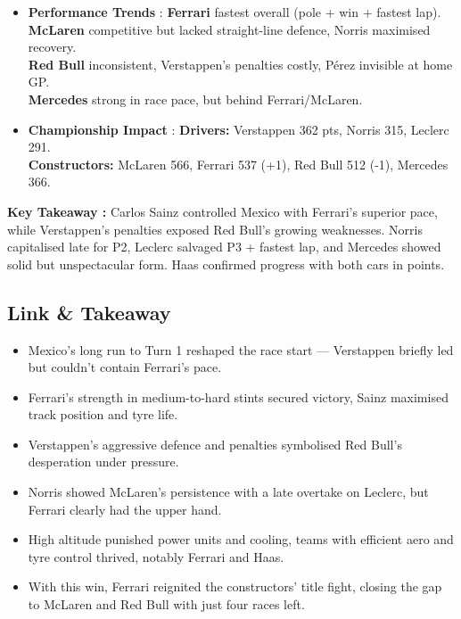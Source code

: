 \begin{itemize}
    \item \textbf{Performance Trends} : \textbf{Ferrari} fastest overall (pole + win + fastest lap). \\
    \textbf{McLaren} competitive but lacked straight-line defence, Norris maximised recovery. \\
    \textbf{Red Bull} inconsistent, Verstappen’s penalties costly, Pérez invisible at home GP. \\
    \textbf{Mercedes} strong in race pace, but behind Ferrari/McLaren.
    
    \item \textbf{Championship Impact} : \textbf{Drivers:} Verstappen 362 pts, Norris 315, Leclerc 291. \\
    \textbf{Constructors:} McLaren 566, Ferrari 537 (+1), Red Bull 512 (-1), Mercedes 366.
\end{itemize}

\textbf{Key Takeaway :} Carlos Sainz controlled Mexico with Ferrari’s superior pace, while Verstappen’s penalties exposed Red Bull’s growing weaknesses. Norris capitalised late for P2, Leclerc salvaged P3 + fastest lap, and Mercedes showed solid but unspectacular form. Haas confirmed progress with both cars in points.

\subsection{Link \& Takeaway}

\begin{itemize}
    \item Mexico’s long run to Turn 1 reshaped the race start — Verstappen briefly led but couldn’t contain Ferrari’s pace. 
    \item Ferrari’s strength in medium-to-hard stints secured victory, Sainz maximised track position and tyre life. 
    \item Verstappen’s aggressive defence and penalties symbolised Red Bull’s desperation under pressure. 
    \item Norris showed McLaren’s persistence with a late overtake on Leclerc, but Ferrari clearly had the upper hand. 
    \item High altitude punished power units and cooling, teams with efficient aero and tyre control thrived, notably Ferrari and Haas. 
    \item With this win, Ferrari reignited the constructors’ title fight, closing the gap to McLaren and Red Bull with just four races left.
\end{itemize}
